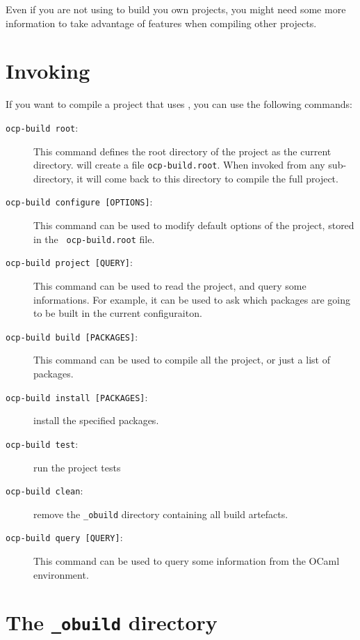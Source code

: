 Even if you are not using \ocpbuild{} to build you own projects, you
might need some more information to take advantage of \ocpbuild{}
features when compiling other projects.

\section{Invoking \ocpbuild{}}

If you want to compile a project that uses \ocpbuild{}, you can use
the following commands:

\begin{description}
\item[{\tt ocp-build root}:] This command defines the root directory
  of the project as the current directory. \ocpbuild{} will create a
  file {\tt ocp-build.root}. When invoked from any sub-directory, it
  will come back to this directory to compile the full project.
\item[{\tt ocp-build configure [OPTIONS]}:] This command can be used
  to modify default options of the project, stored in the {\tt
    ocp-build.root} file. 
\item[{\tt ocp-build project [QUERY]}:] This command can be used to
  read the project, and query some informations. For example, it can
  be used to ask which packages are going to be built in the current
  configuraiton.
\item[{\tt ocp-build build [PACKAGES]}:] This command can be used to
  compile all the project, or just a list of packages.
\item[{\tt ocp-build install [PACKAGES]}:] install the specified
  packages.
\item[{\tt ocp-build test}:] run the project tests
\item[{\tt ocp-build clean}:] remove the {\tt \_obuild} directory
  containing all build artefacts.
\item[{\tt ocp-build query [QUERY]}:] This command can be used to
  query some information from the OCaml environment.
\end{description}


\section{The {\tt \_obuild} directory}

